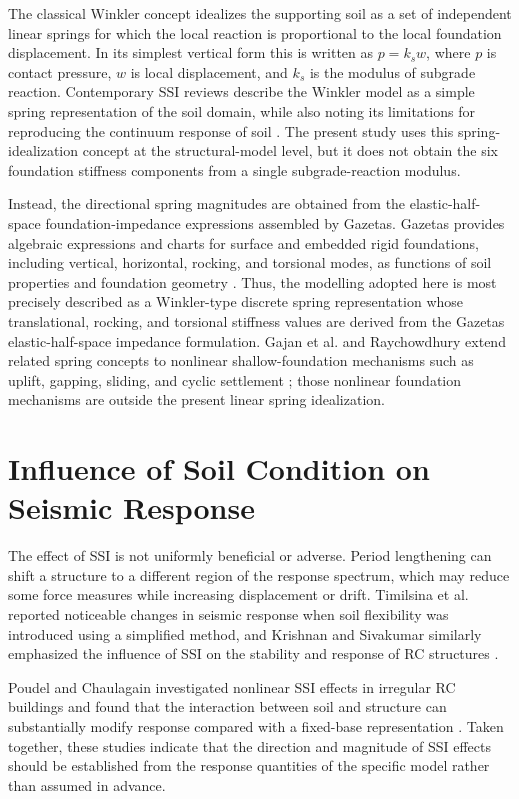 The classical Winkler concept idealizes the supporting soil as a set of independent linear springs for which the local reaction is proportional to the local foundation displacement. In its simplest vertical form this is written as $p=k_s w$, where $p$ is contact pressure, $w$ is local displacement, and $k_s$ is the modulus of subgrade reaction. Contemporary SSI reviews describe the Winkler model as a simple spring representation of the soil domain, while also noting its limitations for reproducing the continuum response of soil \cite{krishnan2024}. The present study uses this spring-idealization concept at the structural-model level, but it does not obtain the six foundation stiffness components from a single subgrade-reaction modulus.

Instead, the directional spring magnitudes are obtained from the elastic-half-space foundation-impedance expressions assembled by Gazetas. Gazetas provides algebraic expressions and charts for surface and embedded rigid foundations, including vertical, horizontal, rocking, and torsional modes, as functions of soil properties and foundation geometry \cite{gazetas1991}. Thus, the modelling adopted here is most precisely described as a Winkler-type discrete spring representation whose translational, rocking, and torsional stiffness values are derived from the Gazetas elastic-half-space impedance formulation. Gajan et al. and Raychowdhury extend related spring concepts to nonlinear shallow-foundation mechanisms such as uplift, gapping, sliding, and cyclic settlement \cite{gajan2008,raychowdhury2008}; those nonlinear foundation mechanisms are outside the present linear spring idealization.

\section{Influence of Soil Condition on Seismic Response}
The effect of SSI is not uniformly beneficial or adverse. Period lengthening can shift a structure to a different region of the response spectrum, which may reduce some force measures while increasing displacement or drift. Timilsina et al. reported noticeable changes in seismic response when soil flexibility was introduced using a simplified method, and Krishnan and Sivakumar similarly emphasized the influence of SSI on the stability and response of RC structures \cite{timilsina2023,krishnan2024}.

Poudel and Chaulagain investigated nonlinear SSI effects in irregular RC buildings and found that the interaction between soil and structure can substantially modify response compared with a fixed-base representation \cite{poudel2024}. Taken together, these studies indicate that the direction and magnitude of SSI effects should be established from the response quantities of the specific model rather than assumed in advance.

